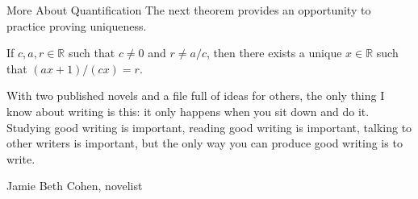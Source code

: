 \begin{section}{More About Quantification}
The next theorem provides an opportunity to practice proving uniqueness.

\begin{theorem}
If $c,a,r\in\mathbb{R}$ such that $c\neq 0$ and $r\neq a/c$, then there exists a unique $x\in\mathbb{R}$ such that $(ax+1)/(cx)=r$.
\end{theorem}

\epigraph{With two published novels and a file full of ideas for others, the only thing I know about writing is this: it only happens when you sit down and do it. Studying good writing is important, reading good writing is important, talking to other writers is important, but the only way you can produce good writing is to write.}{Jamie Beth Cohen, novelist}

\end{section}